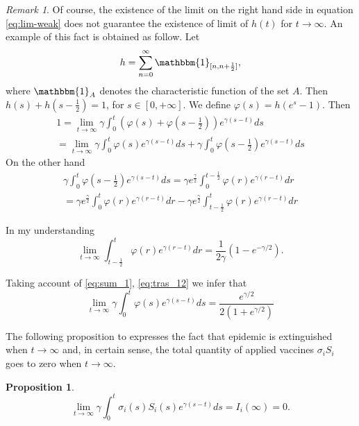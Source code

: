 \documentclass[a4paper,10pt]{article}
\newtheorem{prop}[thm]{Proposition}
\theoremstyle{remark}
\newtheorem{comentario}{Remark}
\begin{document}
\begin{comentario} Of course, the existence of the limit on the right hand side in equation \eqref{eq:lim-weak}   does not guarantee the existence of limit of $h(t)$ for $t\to\infty$. An example of this fact is obtained as follow. Let 
\[
 h=\sum_{n=0}^{\infty}\mathbbm{1}_{[n,n+\frac12]},
\]
where $\mathbbm{1}_{A}$ denotes the characteristic function of the set $A$.  Then $h(s)+h(s-\frac12)=1$, for $s\in [0,+\infty]$. 
We define $\varphi(s)=h(e^s-1)$. Then
\begin{multline}\label{eq:sum_1}
 1=\lim\limits_{t\to\infty}\gamma\int_0^t \left(\varphi(s)+\varphi\left(s-\frac12\right)
 \right) e^{\gamma (s-t)}ds\\=\lim\limits_{t\to\infty}\gamma\int_0^t\varphi(s)e^{\gamma (s-t)}ds+ \gamma\int_0^t \varphi\left(s-\frac12\right)
  e^{\gamma (s-t)}ds
\end{multline}
On the other hand
\begin{multline}\label{eq:tras_12}
 \gamma\int_0^t \varphi\left(s-\frac12\right)
  e^{\gamma (s-t)}ds= \gamma e^{\frac{\gamma}{2}}\int_0^{t-\frac12} \varphi\left(r\right)
  e^{\gamma (r-t)}dr\\=\gamma e^{\frac{\gamma}{2}}\int_0^{t} \varphi\left(r\right)
  e^{\gamma (r-t)}dr-
  \gamma e^{\frac{\gamma}{2}}\int_{t-\frac12}^{t} \varphi\left(r\right)
  e^{\gamma (r-t)}dr
\end{multline}

In my understanding
\[
\lim\limits_{t\to\infty} \int_{t-\frac12}^{t} \varphi\left(r\right)
  e^{\gamma (r-t)}dr= \frac{1}{2\gamma}(1-e^{-\gamma/2}).
\]

Taking account of \eqref{eq:sum_1}, \eqref{eq:tras_12} we infer that 
\[
\lim\limits_{t\to\infty} \gamma \int_{0}^{t} \varphi\left(s\right)
  e^{\gamma (s-t)}ds=\frac{e^{\gamma/2}}{2(1+e^{\gamma/2})}
\]


\end{comentario}

The following proposition to expresses the fact that epidemic is extinguished when $t\to\infty$ and, in certain sense, the total quantity of applied vaccines $\sigma_iS_i$ goes to zero when $t\to\infty$.   

\begin{prop} 
\[
 \lim\limits_{t\to\infty}\gamma\int_0^t \sigma_i(s)S_i(s)
  e^{\gamma (s-t)}ds=I_i(\infty)=0.
\]

 
\end{prop}
\end{document}
